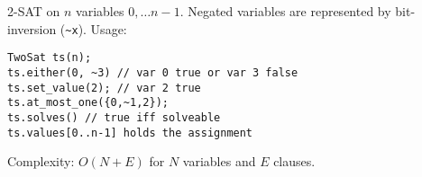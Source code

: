 2-SAT on $n$ variables $0, \dots n-1$. Negated variables are represented by bit-inversion (\lstinline{~x}). Usage:
\begin{lstlisting}
TwoSat ts(n);
ts.either(0, ~3) // var 0 true or var 3 false
ts.set_value(2); // var 2 true
ts.at_most_one({0,~1,2});
ts.solves() // true iff solveable
ts.values[0..n-1] holds the assignment
\end{lstlisting}
Complexity: $O(N+E)$ for $N$ variables and $E$ clauses.
